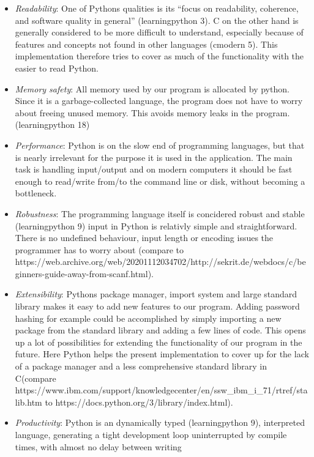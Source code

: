 \begin{itemize}
\tightlist
\item
  \emph{Readability}: One of Pythons qualities is its ``focus on
  readability, coherence, and software quality in general''
  (learningpython 3). C on the other hand is generally considered to be
  more difficult to understand, especially because of features and
  concepts not found in other languages (cmodern 5). This implementation
  therefore tries to cover as much of the functionality with the easier
  to read Python.
\item
  \emph{Memory safety}: All memory used by our program is allocated by
  python. Since it is a garbage-collected language, the program does not
  have to worry about freeing unused memory. This avoids memory leaks in
  the program. (learningpython 18)
\item
  \emph{Performance}: Python is on the slow end of programming
  languages, but that is nearly irrelevant for the purpose it is used in
  the application. The main task is handling input/output and on modern
  computers it should be fast enough to read/write from/to the command
  line or disk, without becoming a bottleneck.
\item
  \emph{Robustness}: The programming language itself is concidered
  robust and stable (learningpython 9) input in Python is relativly
  simple and straightforward. There is no undefined behaviour, input
  length or encoding issues the programmer has to worry about (compare
  to
  https://web.archive.org/web/20201112034702/http://sekrit.de/webdocs/c/beginners-guide-away-from-scanf.html).
\item
  \emph{Extensibility}: Pythons package manager, import system and large
  standard library makes it easy to add new features to our program.
  Adding password hashing for example could be accomplished by simply
  importing a new package from the standard library and adding a few
  lines of code. This opens up a lot of possibilities for extending the
  functionality of our program in the future. Here Python helps the
  present implementation to cover up for the lack of a package manager
  and a less comprehensive standard library in C(compare
  https://www.ibm.com/support/knowledgecenter/en/ssw\_ibm\_i\_71/rtref/stalib.htm
  to https://docs.python.org/3/library/index.html).
\item
  \emph{Productivity}: Python is an dynamically typed (learningpython
  9), interpreted language, generating a tight development loop
  uninterrupted by compile times, with almost no delay between writing

\end{itemize}
